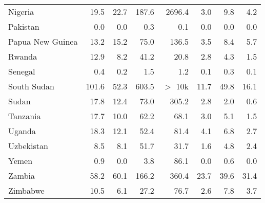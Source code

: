 \begin{table}[b]
\begin{tabular}[t]{lrrrrrrr}
Nigeria & 19.5 & 22.7 & 187.6 & 2696.4 & 3.0 & 9.8 & 4.2\\
Pakistan & 0.0 & 0.0 & 0.3 & 0.1 & 0.0 & 0.0 & 0.0\\
Papua New Guinea & 13.2 & 15.2 & 75.0 & 136.5 & 3.5 & 8.4 & 5.7\\
Rwanda & 12.9 & 8.2 & 41.2 & 20.8 & 2.8 & 4.3 & 1.5\\
Senegal & 0.4 & 0.2 & 1.5 & 1.2 & 0.1 & 0.3 & 0.1\\
South Sudan & 101.6 & 52.3 & 603.5 & $>$ 10k & 11.7 & 49.8 & 16.1\\
Sudan & 17.8 & 12.4 & 73.0 & 305.2 & 2.8 & 2.0 & 0.6\\
Tanzania & 17.7 & 10.0 & 62.2 & 68.1 & 3.0 & 5.1 & 1.5\\
Uganda & 18.3 & 12.1 & 52.4 & 81.4 & 4.1 & 6.8 & 2.7\\
Uzbekistan & 8.5 & 8.1 & 51.7 & 31.7 & 1.6 & 4.8 & 2.4\\
Yemen & 0.9 & 0.0 & 3.8 & 86.1 & 0.0 & 0.6 & 0.0\\
Zambia & 58.2 & 60.1 & 166.2 & 360.4 & 23.7 & 39.6 & 31.4\\
Zimbabwe & 10.5 & 6.1 & 27.2 & 76.7 & 2.6 & 7.8 & 3.7\\
\bottomrule
\end{tabular}
\end{table}